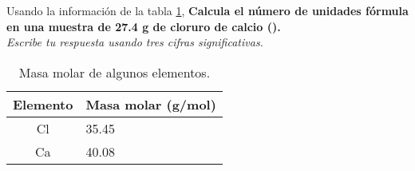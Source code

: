 Usando la información de la tabla \ref{tab:q005},
\textbf{Calcula el número de unidades fórmula en una muestra de 27.4 g de cloruro de calcio ().}\\
\emph{Escribe tu respuesta usando tres cifras significativas.}

\begin{multicols}{2}
    \begin{table}[H]
        \centering
        \caption{Masa molar de algunos elementos.}
        \label{tab:q005}
        \begin{tabular}{c|p{2.2cm}}
            \textbf{Elemento} & \textbf{Masa molar (g/mol)} \\\midrule
            Cl                & 35.45                       \\\hline
            Ca                & 40.08                       \\\hline
            \bottomrule
        \end{tabular}
    \end{table}

    \columnbreak

    \begin{solutionbox}{7cm}
    \end{solutionbox}
\end{multicols}